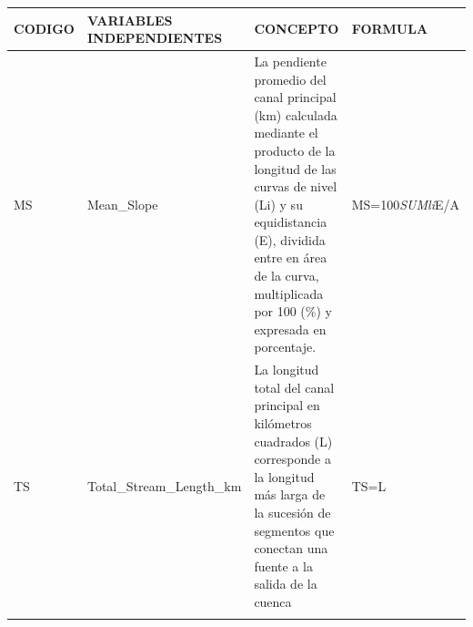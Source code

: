 \documentclass[11pt,]{article}
\begin{document}
\begin{longtable}[]{@{}llll@{}}
\toprule
\begin{minipage}[b]{0.08\columnwidth}\raggedright\strut
CODIGO\strut
\end{minipage} & \begin{minipage}[b]{0.25\columnwidth}\raggedright\strut
VARIABLES INDEPENDIENTES\strut
\end{minipage} & \begin{minipage}[b]{0.44\columnwidth}\raggedright\strut
CONCEPTO\strut
\end{minipage} & \begin{minipage}[b]{0.12\columnwidth}\raggedright\strut
FORMULA\strut
\end{minipage}\tabularnewline
\midrule
\endhead
\begin{minipage}[t]{0.08\columnwidth}\raggedright\strut
MS\strut
\end{minipage} & \begin{minipage}[t]{0.25\columnwidth}\raggedright\strut
Mean\_Slope\strut
\end{minipage} & \begin{minipage}[t]{0.44\columnwidth}\raggedright\strut
La pendiente promedio del canal principal (km) calculada mediante el
producto de la longitud de las curvas de nivel (Li) y su equidistancia
(E), dividida entre en área de la curva, multiplicada por 100 (\%) y
expresada en porcentaje.\strut
\end{minipage} & \begin{minipage}[t]{0.12\columnwidth}\raggedright\strut
MS=100\emph{SUMli}E/A\strut
\end{minipage}\tabularnewline
\begin{minipage}[t]{0.08\columnwidth}\raggedright\strut
TS\strut
\end{minipage} & \begin{minipage}[t]{0.25\columnwidth}\raggedright\strut
Total\_Stream\_Length\_km\strut
\end{minipage} & \begin{minipage}[t]{0.44\columnwidth}\raggedright\strut
La longitud total del canal principal en kilómetros cuadrados (L)
corresponde a la longitud más larga de la sucesión de segmentos que
conectan una fuente a la salida de la cuenca\strut
\end{minipage} & \begin{minipage}[t]{0.12\columnwidth}\raggedright\strut
TS=L\strut
\end{minipage}\tabularnewline
\begin{minipage}[t]{0.08\columnwidth}\raggedright\strut

\end{minipage}
\end{longtable}
\end{document}
